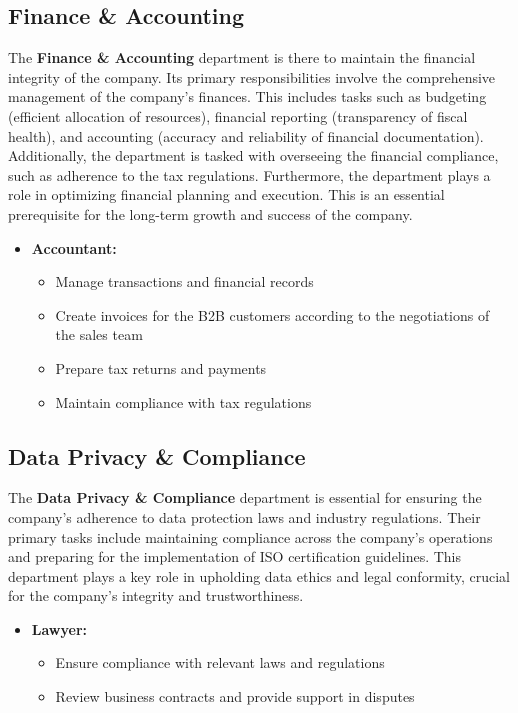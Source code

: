 \subsection{Finance \& Accounting}
The \textbf{Finance \& Accounting} department is there to maintain the financial integrity of the company.
Its primary responsibilities involve the comprehensive management of the company's finances.
This includes tasks such as budgeting (efficient allocation of resources), financial reporting (transparency of fiscal health), and accounting (accuracy and reliability of financial documentation).
Additionally, the department is tasked with overseeing the financial compliance, such as adherence to the tax regulations.
Furthermore, the department plays a role in optimizing financial planning and execution.
This is an essential prerequisite for the long-term growth and success of the company.

\begin{itemize}
    \item \textbf{Accountant:}
    \begin{itemize}
        \item Manage transactions and financial records
        \item Create invoices for the B2B customers according to the negotiations of the sales team
        \item Prepare tax returns and payments
        \item Maintain compliance with tax regulations
    \end{itemize}
\end{itemize}

\subsection{Data Privacy \& Compliance}
The \textbf{Data Privacy \& Compliance} department is essential for ensuring the company's adherence to data protection laws and industry regulations.
Their primary tasks include maintaining compliance across the company's operations and preparing for the implementation of ISO certification guidelines.
This department plays a key role in upholding data ethics and legal conformity, crucial for the company's integrity and trustworthiness.

\begin{itemize}
    \item \textbf{Lawyer:}
            \begin{itemize}
                \item Ensure compliance with relevant laws and regulations
                \item Review business contracts and provide support in disputes
            \end{itemize}
\end{itemize}

